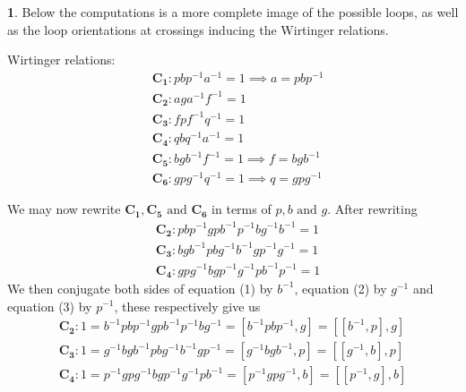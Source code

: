 \documentclass[10.5pt]{article}
\theoremstyle{definition}
\newtheorem{pb}{}
\newcommand{\tand}{\text{ and }}
\begin{document}
    \begin{pb}
        Below the computations is a more complete image of the possible loops, as well as the loop orientations at crossings inducing the Wirtinger relations.

        Wirtinger relations:
        \begin{align*}
            &\mathbf{C_1}: pbp^{-1}a^{-1} = 1 \implies a = pbp^{-1}\\
            &\mathbf{C_2}: aga^{-1}f^{-1} = 1\\
            &\mathbf{C_3}: fpf^{-1}q^{-1} = 1\\
            &\mathbf{C_4}: qbq^{-1}a^{-1} = 1\\
            &\mathbf{C_5}: bgb^{-1}f^{-1} = 1 \implies f = bgb^{-1}\\
            &\mathbf{C_6}: gpg^{-1}q^{-1} = 1 \implies q = gpg^{-1}
        \end{align*}

        We may now rewrite \(\mathbf{C_1},\mathbf{C_5} \tand \mathbf{C_6}\) in terms of \(p,b \tand g\). After rewriting
        \begin{align}
            &\mathbf{C_2}: pbp^{-1}gpb^{-1}p^{-1}bg^{-1}b^{-1} = 1 \\
            &\mathbf{C_3}: bgb^{-1}pbg^{-1}b^{-1}gp^{-1}g^{-1} = 1 \\
            &\mathbf{C_4}: gpg^{-1}bgp^{-1}g^{-1}pb^{-1}p^{-1} = 1
        \end{align}
        We then conjugate both sides of equation (1) by \(b^{-1}\), equation (2) by \(g^{-1}\) and equation (3) by \(p^{-1}\), these respectively give us
        \begin{align*}
            \mathbf{C_2}: 1 = b^{-1}pbp^{-1}gpb^{-1}p^{-1}bg^{-1} = [b^{-1}pbp^{-1},g] = [[b^{-1},p],g] \\
            \mathbf{C_3}: 1 = g^{-1}bgb^{-1}pbg^{-1}b^{-1}gp^{-1} = [g^{-1}bgb^{-1},p] = [[g^{-1},b],p] \\
            \mathbf{C_4}: 1 = p^{-1}gpg^{-1}bgp^{-1}g^{-1}pb^{-1} = [p^{-1}gpg^{-1},b] = [[p^{-1},g],b]
        \end{align*}


\end{pb}
\end{document}
